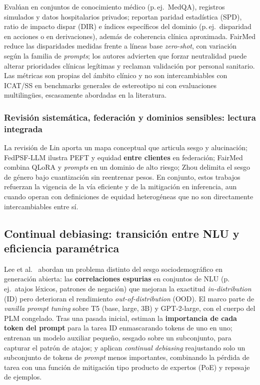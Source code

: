 \documentclass[12pt,a4paper]{report}
\begin{document}
Evalúan en conjuntos de conocimiento médico (p.\,ej.\ MedQA), registros simulados y datos hospitalarios privados; reportan paridad estadística (SPD), ratio de impacto dispar (DIR) e índices específicos del dominio (p.\,ej.\ disparidad en acciones o en derivaciones), además de coherencia clínica aproximada. FairMed reduce las disparidades medidas frente a líneas base \textit{zero-shot}, con variación según la familia de \textit{prompts}; los autores advierten que forzar neutralidad puede alterar prioridades clínicas legítimas y reclaman validación por personal sanitario. Las métricas son propias del ámbito clínico y no son intercambiables con ICAT/SS en benchmarks generales de estereotipo ni con evaluaciones multilingües, escasamente abordadas en la literatura.

\subsubsection{Revisión sistemática, federación y dominios sensibles: lectura integrada}

La revisión de Lin aporta un mapa conceptual que articula sesgo y alucinación; FedPSF-LLM ilustra PEFT y equidad \textbf{entre clientes} en federación; FairMed combina QLoRA y \textit{prompts} en un dominio de alto riesgo; Zhou delimita el sesgo de género bajo cuantización sin reentrenar pesos. En conjunto, estos trabajos refuerzan la vigencia de la vía eficiente y de la mitigación en inferencia, aun cuando operan con definiciones de equidad heterogéneas que no son directamente intercambiables entre sí.

\subsection{Continual debiasing: transición entre NLU y eficiencia paramétrica}
\label{subsec:sintesis_continual_debiasing}

Lee et al.\ \cite{lee_continual_2025} abordan un problema distinto del sesgo sociodemográfico en generación abierta: las \textbf{correlaciones espurias} en conjuntos de NLU (p.\,ej.\ atajos léxicos, patrones de negación) que mejoran la exactitud \textit{in-distribution} (ID) pero deterioran el rendimiento \textit{out-of-distribution} (OOD). El marco parte de \textit{vanilla prompt tuning} sobre T5 (base, large, 3B) y GPT-2-large, con el cuerpo del PLM congelado. Tras una pasada inicial, estiman la \textbf{importancia de cada token del prompt} para la tarea ID enmascarando tokens de uno en uno; entrenan un modelo auxiliar pequeño, sesgado sobre un subconjunto, para capturar el patrón de atajos; y aplican \textit{continual debiasing} reajustando solo un subconjunto de tokens de \textit{prompt} menos importantes, combinando la pérdida de tarea con una función de mitigación tipo producto de expertos (PoE) y repesaje de ejemplos.
\end{document}

